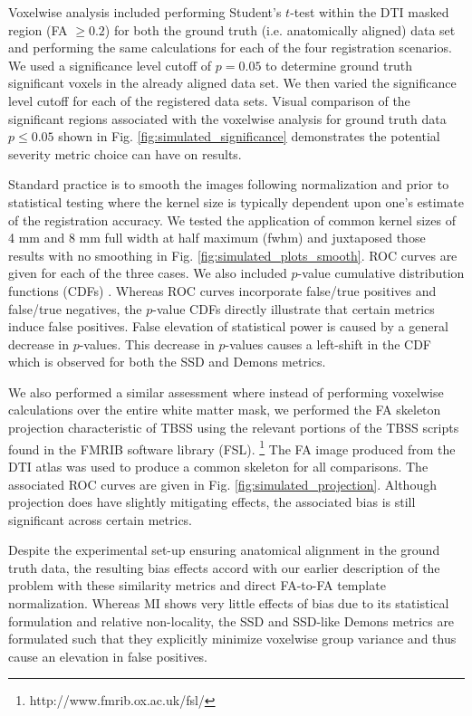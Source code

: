 \documentclass[final,5p,times,twocolumn]{elsarticle}
\begin{document}
Voxelwise analysis included performing Student's $t$-test within the
DTI masked region (FA $\geq 0.2$) for both the ground truth (i.e.
anatomically aligned) data set and performing the same calculations
for each of the four registration scenarios.  We used a significance
level cutoff of $p = 0.05$ to determine ground truth significant
voxels in the already aligned data set.  We then varied the 
significance level cutoff for each of the registered data sets.
Visual comparison of the significant regions associated with the 
voxelwise analysis for ground truth data {\color{red}{and the data using 
 the different similarity metrics 
for}}
$p \leq 0.05$ shown in Fig. \ref{fig:simulated_significance} demonstrates 
the potential severity metric choice can have on results.

Standard practice is to smooth the images following normalization and
prior to statistical testing where the kernel size is typically dependent upon
one's estimate of the registration accuracy.  We tested the application
of common kernel sizes of 4 mm and 8 mm full width at half
maximum (fwhm) and juxtaposed those results with no smoothing in
Fig. \ref{fig:simulated_plots_smooth}.  ROC curves are given
for each of the three cases.
We also included $p$-value cumulative distribution functions (CDFs) \cite{yanovsky2009}.
Whereas ROC curves incorporate false/true positives and false/true
negatives, the $p$-value CDFs directly illustrate that certain metrics 
induce false positives.  False elevation of statistical power is caused
by a general decrease in $p$-values.  This decrease in $p$-values causes
a left-shift in the CDF which is observed for both the SSD and Demons metrics.

We also performed a similar assessment
where instead of performing voxelwise calculations over the entire
white matter mask, we performed the FA skeleton projection characteristic
of TBSS using the relevant portions of the TBSS scripts found in the 
FMRIB software library (FSL).%
\footnote{
http://www.fmrib.ox.ac.uk/fsl/
}
The FA 
image produced from the
DTI atlas was used to produce a common skeleton for all comparisons.
The associated ROC curves are given
in  Fig. \ref{fig:simulated_projection}.  Although projection
does have slightly mitigating effects, the associated bias is still 
significant across certain metrics.  


Despite the experimental set-up ensuring anatomical alignment in the
ground truth data, the resulting bias effects accord with our earlier 
description of the problem with these similarity metrics and direct
FA-to-FA template normalization.  
Whereas MI shows very little effects of bias due to its statistical
formulation and relative non-locality, the SSD and SSD-like Demons
metrics are formulated such that they explicitly minimize voxelwise
group variance and thus cause an elevation in false positives.
\end{document}
